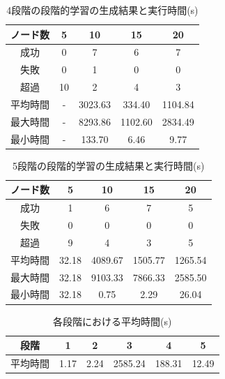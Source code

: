 \documentclass[exploratorypaper]{jsaiart} %
\begin{document}
\begin{table}[htbp]
\caption{4段階の段階的学習の生成結果と実行時間(s)}
\label{tbl:result2}
\begin{tabular}{c|cccc}
    ノード数&	5&	10&	15&	20\\
    \hline \hline
    成功&	0&	7&	6&	7\\
    失敗&	0&	1&	0&	0\\
    超過&	10&	2&	4&	3\\
    \hline
    平均時間&	-&	3023.63&	334.40&	1104.84\\
    最大時間&	- &	8293.86&	1102.60&	2834.49\\
    最小時間&	- &	133.70&	6.46&	9.77\\
    \hline
\end{tabular}
\end{table}

\begin{table}[htbp]
\caption{5段階の段階的学習の生成結果と実行時間(s)}
\label{tbl:result3}
\begin{tabular}{c|cccc}
    ノード数&	5&	10&	15&	20\\
    \hline \hline
    成功&	1&	6&	7&	5\\
    失敗&	0&	0&	0&	0\\
    超過&	9&	4&	3&	5\\
    \hline
    平均時間&	32.18&	4089.67&	1505.77&	1265.54\\
    最大時間&	32.18&	9103.33&	7866.33&	2585.50\\
    最小時間&	32.18&	0.75&	2.29&	26.04\\
    \hline
\end{tabular}
\end{table}

\begin{table}[htbp]
\caption{各段階における平均時間(s)}
\label{tbl:result4}
\begin{tabular}{c|ccccc}
    段階&	1&	2&	3&	4&	5\\
    \hline
    平均時間&	1.17&	2.24&	2585.24&	188.31&	12.49\\
\end{tabular}
\end{table}


\end{document}
